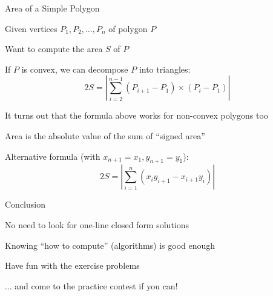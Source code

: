 \documentclass[13pt,onlymath]{beamer}
\begin{document}
\begin{frame}{Area of a Simple Polygon}
\BIT
\item Given vertices $P_1, P_2, \ldots, P_n$ of polygon $P$
\item Want to compute the area $S$ of $P$
\item If $P$ is convex, we can decompose $P$ into triangles:
\[
2S = \left| \sum_{i=2}^{n-1}(P_{i+1} - P_1) \times (P_i - P_1) \right|
\]
\item It turns out that the formula above works for non-convex polygons too
\BIT
\item Area is the absolute value of the sum of ``signed area''
\EIT
\item Alternative formula (with $x_{n+1} = x_1, y_{n+1} = y_1$):
\[
2S = \left| \sum_{i=1}^n (x_i y_{i+1} - x_{i+1} y_i) \right|
\]
\EIT
\end{frame}

\begin{frame}{Conclusion}
\BIT
\item No need to look for one-line closed form solutions
\item Knowing ``how to compute'' (algorithms) is good enough

\item Have fun with the exercise problems
\BIT
\item ... and come to the practice contest if you can!
\EIT
\EIT
\end{frame}
\end{document}

